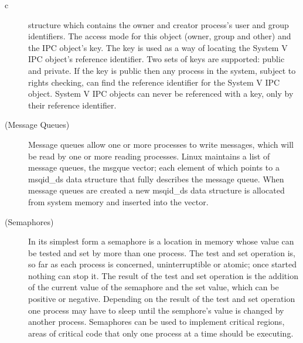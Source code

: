 \documentclass{article}
\begin{document}
\begin{mitned}{c}
\begin{description}
structure which contains the owner and creator process's user and group identifiers. The access mode for this object (owner, group and other) and the 
IPC object's key. The key is used as a way of locating the System V IPC object's reference identifier. Two sets of keys are supported: public and private. 
If the key is public then any process in the system, subject to rights checking, can find the reference identifier for the System V IPC object. System V 
IPC objects can never be referenced with a key, only by their reference identifier.
\item[(Message Queues)] Message queues allow one or more processes to write messages, which will be read by one or more reading processes. 
Linux maintains a list of message queues, the msgque vector; each element of which points to a msqid\_ds data structure that fully describes the message queue. 
When message queues are created a new msqid\_ds data structure is allocated from system memory and inserted into the vector.
\item[(Semaphores)] In its simplest form a semaphore is a location in memory whose value can be tested and set by more than one process. The test and set operation is, so far as each process is concerned, uninterruptible or atomic; once started nothing can stop it. The result of the test and set operation is the addition of the current value of the semaphore and the set value, which can be positive or negative. Depending on the result of the test and set operation one process may have to sleep until the semphore's value is changed by another process. Semaphores can be used to implement critical regions, areas of critical code that only one process at a time should be executing.


\end{description}
\end{mitned}
\end{document}

